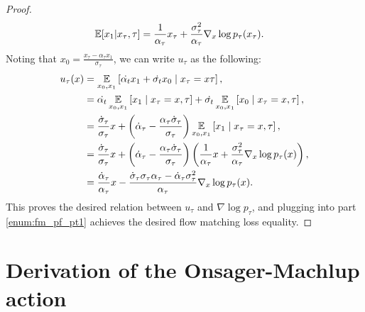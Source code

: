 \begin{proof}
\begin{align}
    \E[ x_1 | x_\tau, \tau] &=  \frac{1}{\alpha_\tau}x_\tau + \frac{\sigma_\tau^2}{\alpha_\tau} \nabla_{x} \log p_\tau (x_\tau).
\end{align}
Noting that $x_0 = \frac{x_\tau - \alpha_\tau x_1}{\sigma_\tau}$, we can write $u_\tau$ as the following:
\begin{align}
    u_\tau(x) &= \E_{x_0, x_1}\left[ \dot{\alpha_t} x_1 + \dot{\sigma_t} x_0 \mid x_\tau = x \tau\right],\\
    &=  \dot{\alpha_t} \E_{x_0, x_1}\left[x_1 \mid x_\tau = x, \tau\right] + \dot{\sigma_t} \E_{x_0, x_1}\left[x_0 \mid x_\tau = x, \tau\right] ,\\
    &= \frac{\dot \sigma_\tau}{\sigma_\tau} x + \left(\dot \alpha_\tau - \frac{\alpha_\tau \dot \sigma_\tau}{\sigma_\tau}\right)\E_{x_0, x_1}\left[x_1 \mid x_\tau = x, \tau\right],\\
    &= \frac{\dot \sigma_\tau}{\sigma_\tau} x + \left(\dot \alpha_\tau - \frac{\alpha_\tau \dot \sigma_\tau}{\sigma_\tau}\right)\left(\frac{1}{\alpha_\tau}x + \frac{\sigma_\tau^2}{\alpha_\tau} \nabla_{x} \log p_\tau (x)\right),\\
    &= \frac{\dot \alpha_\tau}{\alpha_\tau} x - \frac{\dot \sigma_\tau \sigma_\tau \alpha_\tau - \dot \alpha_\tau \sigma_\tau^2}{\alpha_\tau}\nabla_{x} \log p_\tau (x).
\end{align}
This proves the desired relation between $u_\tau$ and $\nabla \log p_\tau$, and plugging into part \ref{enum:fm_pf_pt1} achieves the desired flow matching loss equality.

\end{proof}
\section{Derivation of the Onsager-Machlup action} 
\label{appendix:OM_action}
